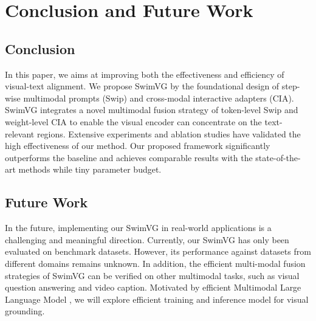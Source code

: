 \section{Conclusion and Future Work}
\subsection{Conclusion}
In this paper, we aims at improving both the effectiveness and efficiency of visual-text alignment. We propose SwimVG by the foundational design of step-wise multimodal prompts (Swip) and cross-modal interactive adapters (CIA). SwimVG integrates a novel multimodal fusion strategy of token-level Swip and weight-level CIA to enable the visual encoder can concentrate on the text-relevant regions. Extensive experiments and ablation studies have validated the high effectiveness of our method. Our proposed framework significantly outperforms the baseline and achieves comparable results with the state-of-the-art methods while tiny parameter budget.

\subsection{Future Work}



In the future, implementing our SwimVG in real-world applications is a challenging and meaningful direction. Currently, our SwimVG has only been evaluated on benchmark datasets. However, its performance against datasets from different domains remains unknown.
In addition, the efficient multi-modal fusion strategies of SwimVG can be verified on other multimodal tasks, such as visual question answering and video caption. Motivated by efficient Multimodal Large Language Model \cite{liu2024multi}, we will explore efficient training and inference model for visual grounding.
